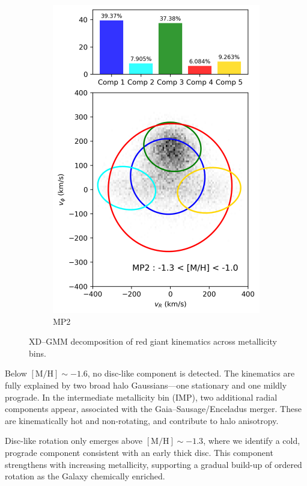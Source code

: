 \documentclass[a4paper,10pt]{article}
\begin{document}
\begin{multicols}{2}
\begin{figure}[H]
\begin{subfigure}[t]{0.24\linewidth}
    \includegraphics[width=\linewidth]{../figures/gmm_MP2.png}
    \caption{MP2}
    \label{fig:gmm_mp2}
  \end{subfigure}

  \caption{XD–GMM decomposition of red giant kinematics across metallicity bins.}
  \label{fig:gmm_zhang}
\end{figure}

Below $\mathrm{[M/H]} \sim -1.6$, no disc-like component is detected. The kinematics are fully explained by two broad halo Gaussians—one stationary and one mildly prograde. In the intermediate metallicity bin (IMP), two additional radial components appear, associated with the Gaia–Sausage/Enceladus merger. These are kinematically hot and non-rotating, and contribute to halo anisotropy.

Disc-like rotation only emerges above $\mathrm{[M/H]} \sim -1.3$, where we identify a cold, prograde component consistent with an early thick disc. This component strengthens with increasing metallicity, supporting a gradual build-up of ordered rotation as the Galaxy chemically enriched.









\end{multicols}
\end{document}

